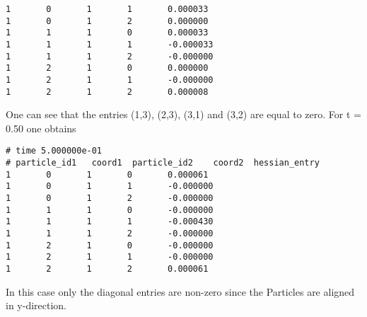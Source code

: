 \documentclass[11pt]{article}
\begin{document}
\begin{enumerate}
\begin{verbatim}
1       0       1       1       0.000033
1       0       1       2       0.000000
1       1       1       0       0.000033
1       1       1       1       -0.000033
1       1       1       2       -0.000000
1       2       1       0       0.000000
1       2       1       1       -0.000000
1       2       1       2       0.000008
\end{verbatim}
One can see that the entries (1,3), (2,3), (3,1) and (3,2) are equal to zero. For t = 0.50 one obtains
\begin{verbatim}
# time 5.000000e-01
# particle_id1   coord1  particle_id2    coord2  hessian_entry
1       0       1       0       0.000061
1       0       1       1       -0.000000
1       0       1       2       -0.000000
1       1       1       0       -0.000000
1       1       1       1       -0.000430
1       1       1       2       -0.000000
1       2       1       0       -0.000000
1       2       1       1       -0.000000
1       2       1       2       0.000061
\end{verbatim}
In this case only the diagonal entries are non-zero since the Particles are aligned in y-direction.
\end{enumerate}
\end{document}
